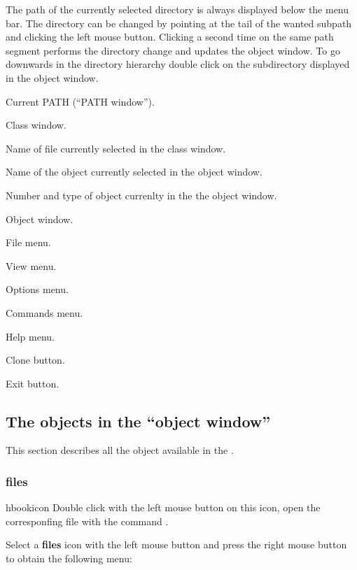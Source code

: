    The path of the currently selected directory is always displayed below the
   menu bar.  The directory can be changed by pointing at the tail of the
   wanted subpath and clicking the left mouse button.  Clicking a second time
   on the same path segment performs the directory change and updates the
   object window.  To go downwards in the directory hierarchy double click on
   the subdirectory displayed in the object window.


\begin{EnumZB}
\item Current PATH (``PATH window'').
\item Class window.
\item Name of file currently selected in the class window.
\item Name of the object currently selected in the object window.
\item Number and type of object currenlty in the the object window.
\item Object window.
\end{EnumZB}

\begin{EnumZW}
\item File menu.
\item View menu.
\item Options menu.
\item Commands menu.
\item Help menu.
\item Clone button.
\item Exit button.
\end{EnumZW}

\subsection{The objects in the ``object window''}
This section describes all the \PAWPP{} object available in the \MB{}.

\subsubsection{\HBOOK{} files}
\begin{ICON}{hbookicon}
Double click with the left mouse button on this icon, open the corresponfing
\HBOOK{} file with the command .
\end{ICON}

Select a {\bf \HBOOK{} files} icon with the left mouse button and press
the right mouse button to obtain the following menu:

